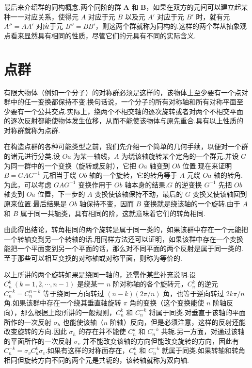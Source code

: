 最后来介绍群的同构概念.两个同阶的群 $\boldsymbol{A}$ 和 $\boldsymbol{B}$，如果在双方的元间可以建立起某种一一对应关系，使得元 $A$ 对应于元 $B$ 以及元 $A'$ 对应于元 $B'$ 时，就有元 $A''=AA'$ 对应于元 $B''=BB'$，则这两个群就称为同构的.这样的两个群从抽象观点看来显然具有相同的性质，尽管它们的元具有不同的实际含义.

\section{点群}

有限大物体（例如一个分子）的对称群必须是这样的，该物体上至少要有一个点对群中的任一变换都保持不变.换句话说，一个分子的所有对称轴和所有对称平面至少要有一个公共交点.实际上，绕两个不相交轴的逐次旋转或者对两个不相交平面的逐次反射都能使物体发生位移，从而不能使该物体与原先重合.具有以上性质的对称群就称为点群.

在构造点群的各种可能类型之前，我们先介绍一个简单的几何手续，以便对一个群的诸元进行分类.设 $Oa$ 为某一轴线，$A$ 为绕该轴旋转某个定角的一个群元.并设 $G$ 为同一群中的一个变换（旋转或反射），它把 $Oa$ 轴变到 $Ob$ 位置.现在来证明 $B=GAG^{-1}$ 元相当于绕 $Ob$ 轴的一个旋转，它的转角等于 $A$ 元绕 $Oa$ 轴的转角.为此，可以考虑 $GAG^{-1}$ 变换作用于 $Ob$ 轴本身的结果.$G$ 的逆变换 $G^{-1}$ 先把 $Ob$ 轴变到 $Oa$ 位置，下一步的 $A$ 变换使该轴保持不动，最后的 $G$ 变换又使该轴回到原来位置.最后结果是 $Ob$ 轴保持不变，因而 $B$ 变换就是绕该轴的一个旋转.由于 $A$ 和 $B$ 属于同一共轭类，具有相同的阶，这就意味着它们的转角相同.

由此得出结论，转角相同的两个旋转是属于同一类的，如果该群中存在一个元能把一个转轴变到另一个转轴的话.用同样方法还可以证明，如果该群中存在一个变换能把一个平面变到另一个平面的话，那么对不同平面的两个反射是属于同一类的.至于那些可以相互变换的对称轴或对称平面，则称为等价的.

以上所讲的两个旋转如果是绕同一轴的，还需作某些补充说明.设 $C_n^k\ (k=1,2,\cdots,n-1)$ 是绕某一 $n$ 阶对称轴的各个旋转元，$C_n^k$ 的逆元 $C_n^{-k}=C_n^{n-k}$ 等于绕同一方向转过 $(n-k)(2\pi/n)$ 角，也等于逆向转过 $2k\pi/n$ 角.如果该群中存在一个绕其垂直轴旋转 $\pi$ 角的变换（这个变换能使 $n$ 阶轴反向），那么根据上段所讲的一般规则，$C_n^k$ 和 $C_n^{-k}$ 将属于同类.对垂直于该轴的平面所作的一次反射 $\sigma_h$ 也能使该轴（$n$ 阶轴）反向，但是必须注意，这样的反射还能改变旋转的方向.因此 $\sigma_h$ 的存在并不能使 $C_n^k$ 和 $C_n^{-k}$ 共轭.另一方面，对通过该轴的平面所作的一次反射 $\sigma_v$ 并不能改变该轴的方向但能改变旋转的方向，因此有 $C_n^{-k}=\sigma_vC_n^k\sigma_v$.如果有这样的对称面存在，$C_n^k$ 和 $C_n^{-k}$ 就属于同类.如果转轴和转角相同但旋转方向不同的两个元是共轭的，该转轴就称为双向轴.

